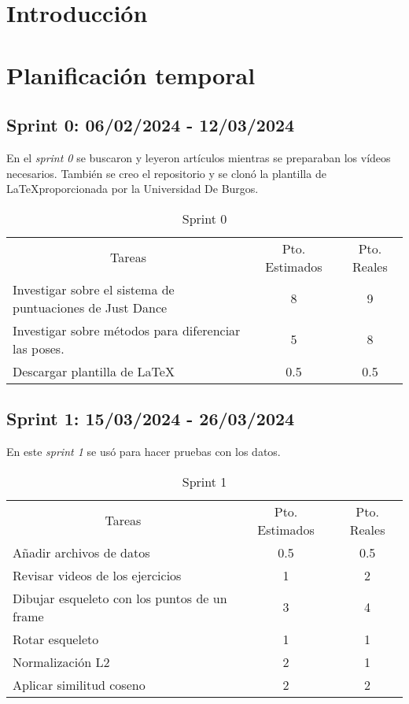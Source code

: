 
\section{Introducción}

\section{Planificación temporal}

\subsection{Sprint 0: 06/02/2024 - 12/03/2024}
En el \textit{sprint 0} se buscaron y leyeron artículos mientras se preparaban los vídeos necesarios. También se creo el repositorio y se clonó la plantilla de \LaTeX proporcionada por la Universidad De Burgos.

\begin{table}[H]
	\begin{tabular}{lcc}
		\multicolumn{1}{c}{Tareas} & Pto. Estimados & Pto. Reales\\
		Investigar sobre el sistema de puntuaciones de Just Dance & 8 & 9 \\
	 	Investigar sobre métodos para diferenciar las poses. & 5 & 8 \\
	 	Descargar plantilla de \LaTeX & 0.5 & 0.5 \\
	\end{tabular}
\caption{Sprint 0}
\label{sprint0}
\end{table}

\subsection{Sprint 1: 15/03/2024 - 26/03/2024}
En este \textit{sprint 1} se usó para hacer pruebas con los datos.

\begin{table}[H]
	\begin{tabular}{lcc}
		\multicolumn{1}{c}{Tareas} & Pto. Estimados & Pto. Reales\\
		Añadir archivos de datos & 0.5 & 0.5 \\
		Revisar videos de los ejercicios & 1 & 2 \\
		Dibujar esqueleto con los puntos de un frame & 3 & 4 \\
		Rotar esqueleto & 1 & 1 \\
		Normalización L2 & 2 & 1 \\
		Aplicar similitud coseno & 2 & 2 \\
		
	\end{tabular}
	\caption{Sprint 1}
	\label{sprint1}
\end{table}

